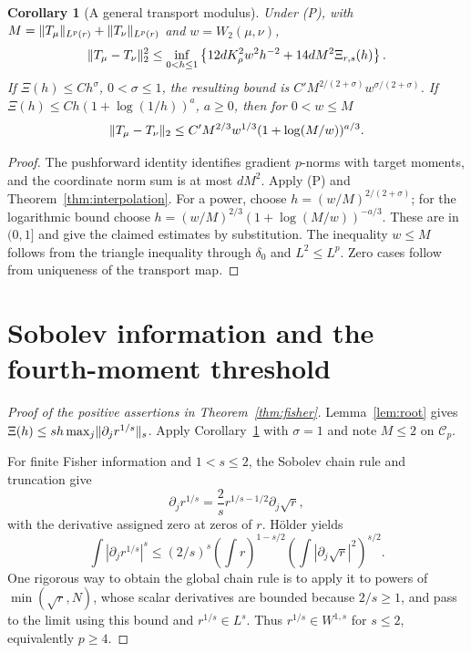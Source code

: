 \documentclass[11pt]{article}
\newtheorem{corollary}[theorem]{Corollary}
\theoremstyle{remark}\newtheorem{remark}[theorem]{Remark}
\begin{document}
\begin{corollary}[A general transport modulus]\label{cor:transport}
Under (P), with
$M=\lVert T_\mu\rVert_{L^p(r)}+\lVert T_\nu\rVert_{L^p(r)}$ and $w=W_2(\mu,\nu)$,
\begin{equation}\label{eq:general-transport}
 \lVert T_\mu-T_\nu\rVert_2^2
 \le\inf_{0<h\le1}\left\{12dK_\rho^2w^2h^{-2}
                          +14dM^2\Xi_{r,s}(h)\right\}.
\end{equation}
If $\Xi(h)\le C h^\sigma$, $0<\sigma\le1$, the resulting bound is
$C' M^{2/(2+\sigma)}w^{\sigma/(2+\sigma)}$. If
$\Xi(h)\le C h(1+\log(1/h))^a$, $a\ge0$, then for $0<w\le M$
\[
 \lVert T_\mu-T_\nu\rVert_2
 \le C'M^{2/3}w^{1/3}(1+\log(M/w))^{a/3}.
\]
\end{corollary}
\begin{proof}
The pushforward identity identifies gradient $p$-norms with target moments, and the coordinate norm sum is at most $dM^2$. Apply (P) and Theorem~\ref{thm:interpolation}. For a power, choose $h=(w/M)^{2/(2+\sigma)}$; for the logarithmic bound choose
$h=(w/M)^{2/3}(1+\log(M/w))^{-a/3}$.
These are in $(0,1]$ and give the claimed estimates by substitution. The inequality $w\le M$ follows from the triangle inequality through $\delta_0$ and $L^2\le L^p$. Zero cases follow from uniqueness of the transport map.
\end{proof}

\section{Sobolev information and the fourth-moment threshold}\label{sec:fisher}
\begin{proof}[Proof of the positive assertions in Theorem~\ref{thm:fisher}]
Lemma~\ref{lem:root} gives $\Xi(h)\le s h\max_j\lVert\partial_jr^{1/s}\rVert_s$. Apply Corollary~\ref{cor:transport} with $\sigma=1$ and note $M\le2$ on $\mathcal C_p$.

For finite Fisher information and $1<s\le2$, the Sobolev chain rule and truncation give
\[
 \partial_j r^{1/s}=\frac2s r^{1/s-1/2}\partial_j\sqrt r,
\]
with the derivative assigned zero at zeros of $r$. H\"older yields
\[
 \int|\partial_j r^{1/s}|^s
 \le(2/s)^s\left(\int r\right)^{1-s/2}
                \left(\int|\partial_j\sqrt r|^2\right)^{s/2}.
\]
One rigorous way to obtain the global chain rule is to apply it to powers of $\min(\sqrt r,N)$, whose scalar derivatives are bounded because $2/s\ge1$, and pass to the limit using this bound and $r^{1/s}\in L^s$. Thus $r^{1/s}\in W^{1,s}$ for $s\le2$, equivalently $p\ge4$.
\end{proof}
\end{document}
